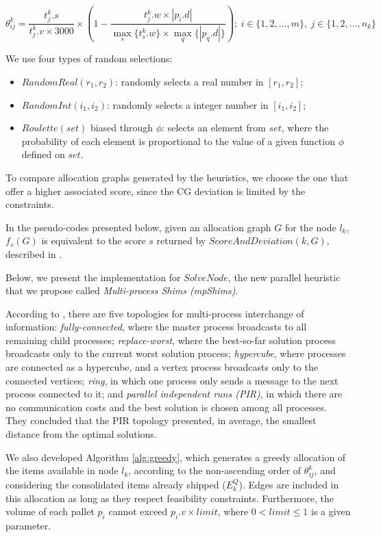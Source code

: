 \documentclass[preprint,authoryear]{elsarticle}
\begin{document}
\begin{equation} \label{eq:edge}
	\theta^k_{ij}= \frac{t^k_j.s}{t^k_j.v \times 3000}\times(1-\frac{t^k_j.w\times|p_i.d|}{\max_s\{t^k_s.w\}\times\max_q\{|p_q.d|\}});\ i \in \{1,2,\ldots,m\},\ j \in \{1,2,\ldots,n_k\}
\end{equation} 


We use four types of random selections:
\begin{itemize}
	\item $RandomReal(r_1,r_2)$: randomly selects a real number in $[r_1,r_2]$;
	\item $RandomInt(i_1,i_2)$: randomly selects a integer number in $[i_1,i_2]$;
	\item $Roulette(set)$ biased through $\phi$: selects an element from $set$, where the probability of each element is proportional to the value of a given function $\phi$\/ defined on $set$.
\end{itemize}


To compare allocation graphs generated by the heuristics, we choose the one that offer a higher associated score, since the CG deviation is limited by the constraints.

In the pseudo-codes presented below, given an allocation graph $G$\/ for the node $l_k$, $f_s(G)$\/ is equivalent to the score $s$\/ returned by $ScoreAndDeviation(k,G) $, described in \cite{MesquitaSanches2023}.

Below, we present the implementation for $SolveNode$, the new parallel heuristic that we propose called {\it Multi-process Shims (mpShims)}.

According to \cite[p.226]{manfrin2006}, there are five topologies for multi-process interchange of information: {\it fully-connected}, where the master process broadcasts to all remaining child processes; {\it replace-worst}, where the best-so-far solution process broadcasts only to the current worst solution process; {\it hypercube}, where processes are connected as a hypercube, and a vertex process broadcasts only to the connected vertices; {\it ring}, in which one process only sends a message to the next process connected to it; and {\it parallel independent runs (PIR)}, in which there are no communication costs and the best solution is chosen among all processes. They concluded that the PIR topology presented, in average, the smallest distance from the optimal solutions.


We also developed Algorithm \ref{alg:greedy}, which generates a greedy allocation of the items available in node $l_k$, according to the non-ascending order of $\theta^k_{ij}$, and considering the consolidated items already shipped ($E^Q_k$). Edges are included in this allocation as long as they respect feasibility constraints. Furthermore, the volume of each pallet $p_i$\/ cannot exceed $p_i.v \times limit$, where $ 0 < limit \leq 1$\/ is a given parameter.
\end{document}

